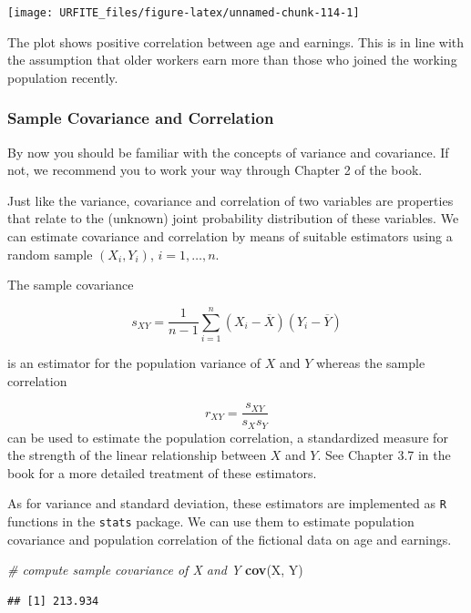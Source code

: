 \documentclass[]{book}
\newenvironment{Shaded}{\begin{snugshade}}{\end{snugshade}}
\newcommand{\KeywordTok}[1]{\textcolor[rgb]{0.13,0.29,0.53}{\textbf{#1}}}
\newcommand{\CommentTok}[1]{\textcolor[rgb]{0.56,0.35,0.01}{\textit{#1}}}
\newcommand{\NormalTok}[1]{#1}
\theoremstyle{definition}
\theoremstyle{definition}
\theoremstyle{definition}
\theoremstyle{remark}
\begin{document}
\begin{center}\texttt{[image: URFITE\_files/figure-latex/unnamed-chunk-114-1]} \end{center}

The plot shows positive correlation between age and earnings. This is in
line with the assumption that older workers earn more than those who
joined the working population recently.

\subsubsection*{Sample Covariance and
Correlation}\label{sample-covariance-and-correlation}

By now you should be familiar with the concepts of variance and
covariance. If not, we recommend you to work your way through Chapter 2
of the book.

Just like the variance, covariance and correlation of two variables are
properties that relate to the (unknown) joint probability distribution
of these variables. We can estimate covariance and correlation by means
of suitable estimators using a random sample \((X_i,Y_i)\),
\(i=1,\dots,n\).

The sample covariance

\[ s_{XY} = \frac{1}{n-1} \sum_{i=1}^n (X_i - \overline{X})(Y_i - \overline{Y}) \]

is an estimator for the population variance of \(X\) and \(Y\) whereas
the sample correlation

\[ r_{XY} = \frac{s_{XY}}{s_Xs_Y} \] can be used to estimate the
population correlation, a standardized measure for the strength of the
linear relationship between \(X\) and \(Y\). See Chapter 3.7 in the book
for a more detailed treatment of these estimators.

As for variance and standard deviation, these estimators are implemented
as \texttt{R} functions in the \texttt{stats} package. We can use them
to estimate population covariance and population correlation of the
fictional data on age and earnings.

\begin{Shaded}
\begin{Highlighting}[]
\CommentTok{# compute sample covariance of X and Y}
\KeywordTok{cov}\NormalTok{(X, Y)}
\end{Highlighting}
\end{Shaded}

\begin{verbatim}
## [1] 213.934
\end{verbatim}
\end{document}
